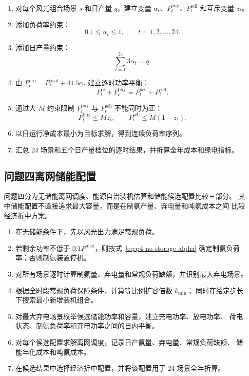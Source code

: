 \begin{enumerate}[label=\textbf{步骤~\arabic*.},leftmargin=4em]
  \item 对每个风光组合场景 $s$ 和日产量 $q$，建立变量
        $\alpha_t$、$P_t^{\mathrm{buy}}$、$P_t^{\mathrm{sell}}$ 和互斥变量 $z_t$。
  \item 添加负荷率约束：
        \[
          0.1\leq\alpha_t\leq1,\qquad t=1,2,\dots,24.
        \]
  \item 添加日产量约束：
        \[
          \sum_{t=1}^{24}3\alpha_t=q.
        \]
  \item 由 $P_t^{\mathrm{use}}=P_t^{\mathrm{load}}+41.5\alpha_t$
        建立逐时功率平衡：
        \[
          P_t^{\mathrm{re}}+P_t^{\mathrm{buy}}
          =P_t^{\mathrm{use}}+P_t^{\mathrm{sell}}.
        \]
  \item 通过大 $M$ 约束限制 $P_t^{\mathrm{buy}}$ 与
        $P_t^{\mathrm{sell}}$ 不能同时为正：
        \[
          P_t^{\mathrm{buy}}\leq Mz_t,\qquad
          P_t^{\mathrm{sell}}\leq M(1-z_t).
        \]
  \item 以日运行净成本最小为目标求解，得到连续负荷率序列。
  \item 汇总 24 场景和五个日产量档位的逐时结果，并折算全年成本和绿电指标。
\end{enumerate}

\subsection{问题四离网储能配置}

问题四分为无储能离网调度、能源自治装机估算和储能候选配置比较三部分。
其中储能配置不直接追求最大容量，而是在制氨产量、弃电量和吨氨成本之间
比较经济折中方案。

\begin{enumerate}[label=\textbf{步骤~\arabic*.},leftmargin=4em]
  \item 在无储能条件下，先以风光出力满足常规负荷。
  \item 若剩余功率不低于 $0.1P^{\max}$，则按式~\eqref{eq:p4-no-storage-alpha}
        确定制氨负荷率；否则制氨装置停机。
  \item 对所有场景逐时计算制氨量、弃电量和常规负荷缺额，并识别最大弃电场景。
  \item 根据全时段常规负荷保障条件，计算等比例扩容倍数 $k_{\min}$；
        同时在给定步长下搜索最小新增装机组合。
  \item 对最大弃电场景枚举候选储能功率和容量，建立充电功率、放电功率、
        荷电状态、制氨负荷率和弃电功率之间的日内平衡。
  \item 对每个候选配置求解离网调度，记录日产氨量、弃电量、常规负荷缺额、
        储能年化成本和吨氨成本。
  \item 在候选结果中选择经济折中配置，并将该配置用于 24 场景全年折算。
\end{enumerate}
